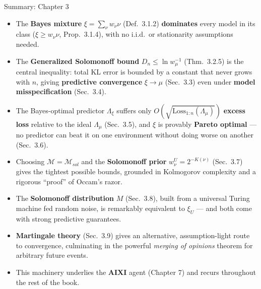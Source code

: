 \documentclass[aspectratio=169,10pt]{beamer}
\newcommand{\Mcal}{\mathcal{M}}
\newcommand{\Loss}{\mathrm{Loss}}
\begin{document}
\begin{frame}{Summary: Chapter 3}
  \begin{itemize}
    \item The \textbf{Bayes mixture} $\xi = \sum_\nu w_\nu\nu$ (Def.\ 3.1.2)
      \textbf{dominates} every model in its class ($\xi\ge w_\nu\nu$, Prop.\
      3.1.4), with no i.i.d.\ or stationarity assumptions needed.
    \item The \textbf{Generalized Solomonoff bound} $D_n\le\ln w_\mu^{-1}$
      (Thm.\ 3.2.5) is the central inequality: total KL error is bounded by a
      constant that never grows with $n$, giving \textbf{predictive
      convergence} $\xi\to\mu$ (Sec.\ 3.3) even under \textbf{model
      misspecification} (Sec.\ 3.4).
    \item The Bayes-optimal predictor $\Lambda_\xi$ suffers only
      $O(\sqrt{\Loss_{1:n}(\Lambda_\mu)})$ \textbf{excess loss} relative to
      the ideal $\Lambda_\mu$ (Sec.\ 3.5), and $\xi$ is provably
      \textbf{Pareto optimal} --- no predictor can beat it on one
      environment without doing worse on another (Sec.\ 3.6).
    \item Choosing $\Mcal=\Mcal_{sol}$ and the \textbf{Solomonoff prior}
      $w_\nu^U=2^{-K(\nu)}$ (Sec.\ 3.7) gives the tightest possible bounds,
      grounded in Kolmogorov complexity and a rigorous ``proof'' of Occam's
      razor.
    \item The \textbf{Solomonoff distribution} $M$ (Sec.\ 3.8), built from a
      universal Turing machine fed random noise, is remarkably equivalent to
      $\xi_U$ --- and both come with strong predictive guarantees.
    \item \textbf{Martingale theory} (Sec.\ 3.9) gives an alternative,
      assumption-light route to convergence, culminating in the powerful
      \emph{merging of opinions} theorem for arbitrary future events.
    \item This machinery underlies the \textbf{AIXI} agent (Chapter 7) and
      recurs throughout the rest of the book.
  \end{itemize}
\end{frame}
\end{document}
